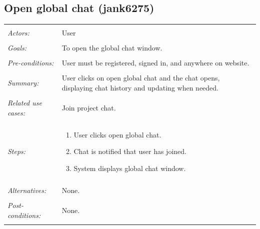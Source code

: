 \documentclass[11pt]{report}
\begin{document}
\begin{IDE-like Features}
\begin{}
\begin{Collaborative features that would be "nice":}
\subsection{Open global chat (jank6275)}
\begin{tabular}{ p{2cm} p{12cm} }
 \hline
 \\
 \textit{Actors:} & User \\ 
 \\
 \textit{Goals:} & To open the global chat window. \\
 \\
 \textit{Pre-conditions:} & User must be registered, signed in, and anywhere on website.  \\
 \\
 \textit{Summary:} & User clicks on open global chat and the chat opens, displaying chat history and updating when needed. \\ 
 \\
 \textit{Related use cases:} & Join project chat. \\ 
 \\
 \textit{Steps:} & \begin{enumerate}
  \item User clicks open global chat.
  \item Chat is notified that user has joined.
  \item System displays global chat window.
 \end{enumerate} \\
 \\
 \textit{Alternatives:} & None. \\
 \\
 \textit{Post-conditions:} & None. \\
 \\
\hline
\end{tabular}


\end{Collaborative features that would be "nice":}
\end{}
\end{IDE-like Features}
\end{document}
